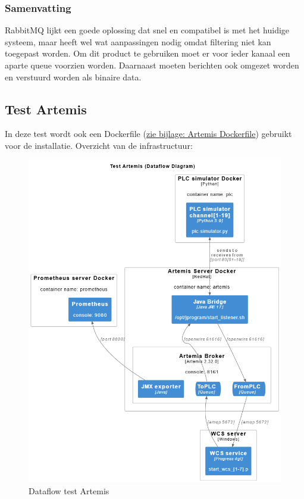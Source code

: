 \subsubsection{Samenvatting}
RabbitMQ lijkt een goede oplossing dat snel en compatibel is met het huidige systeem, 
maar heeft wel wat aanpassingen nodig omdat filtering niet kan toegepast worden.
Om dit product te gebruiken moet er voor ieder kanaal een aparte queue voorzien worden.
Daarnaast moeten berichten ook omgezet worden en verstuurd worden als binaire data.
\newpage

\subsection{Test Artemis}
In deze test wordt ook een Dockerfile (\hyperref[listing:docker_artemis]{zie bijlage: Artemis Dockerfile}) gebruikt voor de installatie.
Overzicht van de infrastructuur:
\begin{figure}[h!]
  \centering
  \includegraphics[width=.95\textwidth]{img/test-artemis-dataflow.png}
  \caption{\label{fig:test_artemis_dataflow}Dataflow test Artemis}
\end{figure}

